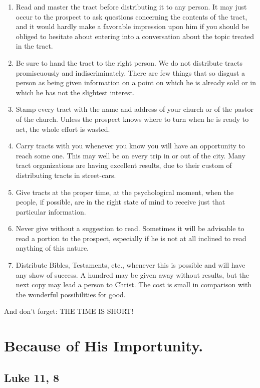 \documentclass[
]{book}
\begin{document}
\begin{enumerate}
\def\labelenumi{\arabic{enumi}.}
\item
  Read and master the tract before distributing it to any person. It may just occur to the prospect to ask questions concerning the contents of the tract, and it would hardly make a favorable impression upon him if you should be obliged to hesitate about entering into a conversation about the topic treated in the tract.
\item
  Be sure to hand the tract to the right person. We do not distribute tracts promiscuously and indiscriminately. There are few things that so disgust a person as being given information on a point on which he is already sold or in which he has not the slightest interest.
\item
  Stamp every tract with the name and address of your church or of the pastor of the church. Unless the prospect knows where to turn when he is ready to act, the whole effort is wasted.
\item
  Carry tracts with you whenever you know you will have an opportunity to reach some one. This may well be on every trip in or out of the city. Many tract organizations are having excellent results, due to their custom of distributing tracts in street-cars.
\item
  Give tracts at the proper time, at the psychological moment, when the people, if possible, are in the right state of mind to receive just that particular information.
\item
  Never give without a suggestion to read. Sometimes it will be advisable to read a portion to the prospect, especially if he is not at all inclined to read anything of this nature.
\item
  Distribute Bibles, Testaments, etc., whenever this is possible and will have any show of success. A hundred may be given away without results, but the next copy may lead a person to Christ. The cost is small in comparison with the wonderful possibilities for good.
\end{enumerate}

And don't forget: THE TIME IS SHORT!

\hypertarget{because-of-his-importunity.}{%
\chapter{Because of His Importunity.}\label{because-of-his-importunity.}}

\hypertarget{luke-11-8}{%
\section*{Luke 11, 8}\label{luke-11-8}}
\end{document}
